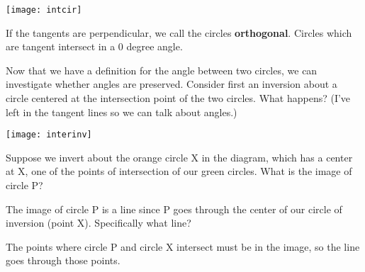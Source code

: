 \begin{center}
    \texttt{[image: intcir]}    
\end{center}
If the tangents are perpendicular, we call the circles \textbf{orthogonal}.  Circles which are tangent intersect in a 0 degree angle.

Now that we have a definition for the angle between two circles, we can investigate whether angles are preserved.  Consider first an inversion about a circle centered at the intersection point of the two circles.  What happens?  (I've left in the tangent lines so we can talk about angles.)

\begin{center}
    \texttt{[image: interinv]}    
\end{center}
Suppose we invert about the orange circle X in the diagram, which has a center at X, one of the points of intersection of our green circles.  What is the image of circle P?





The image of circle P is a line since P goes through the center of our circle of inversion (point X).  Specifically what line?




The points where circle P and circle X intersect must be in the image, so the line goes through those points.

